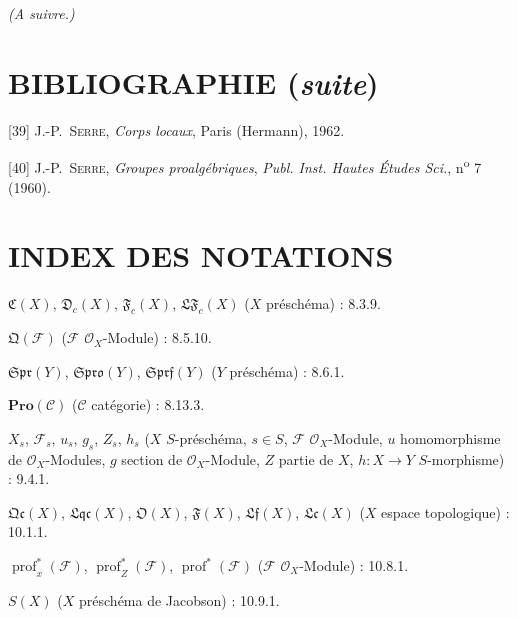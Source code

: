 \begin{center}
\emph{(A suivre.)}
\end{center}

\clearpage
{}
{}
\section*{BIBLIOGRAPHIE (\emph{suite})}

\begingroup
\small
\setlength{\parindent}{0pt}
\setlength{\parskip}{3pt}
[39] J.-P.~\textsc{Serre}, \emph{Corps locaux}, Paris (Hermann), 1962.

[40] J.-P.~\textsc{Serre}, \emph{Groupes proalgébriques}, \emph{Publ. Inst. Hautes Études Sci.}, n\textsuperscript{o} 7 (1960).

\endgroup

\clearpage
{}
{}
\section*{INDEX DES NOTATIONS}

\begingroup
\small
\setlength{\parindent}{0pt}
\setlength{\parskip}{2pt}

$\mathfrak C(X)$, $\mathfrak D_c(X)$, $\mathfrak F_c(X)$,
$\mathfrak{LF}_c(X)$ ($X$ préschéma) : 8.3.9.

$\mathfrak Q(\mathcal F)$ ($\mathcal F$ $\mathcal O_X$-Module) : 8.5.10.

$\mathfrak{Spr}(Y)$, $\mathfrak{Spro}(Y)$, $\mathfrak{Sprf}(Y)$
($Y$ préschéma) : 8.6.1.

$\mathbf{Pro}(\mathcal C)$ ($\mathcal C$ catégorie) : 8.13.3.

$X_s$, $\mathcal F_s$, $u_s$, $g_s$, $Z_s$, $h_s$
($X$ $S$-préschéma, $s\in S$, $\mathcal F$ $\mathcal O_X$-Module,
$u$ homomorphisme de $\mathcal O_X$-Modules, $g$ section de
$\mathcal O_X$-Module, $Z$ partie de $X$, $h:X\to Y$ $S$-morphisme) : 9.4.1.

$\mathfrak{Qc}(X)$, $\mathfrak{Lqc}(X)$, $\mathfrak O(X)$,
$\mathfrak F(X)$, $\mathfrak{Lf}(X)$, $\mathfrak{Lc}(X)$
($X$ espace topologique) : 10.1.1.

$\operatorname{prof}^{*}_{x}(\mathcal F)$,
$\operatorname{prof}^{*}_{Z}(\mathcal F)$,
$\operatorname{prof}^{*}(\mathcal F)$
($\mathcal F$ $\mathcal O_X$-Module) : 10.8.1.

$S(X)$ ($X$ préschéma de Jacobson) : 10.9.1.

